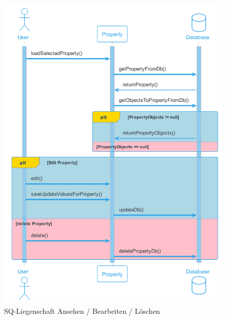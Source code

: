 \begin{figure}[H]
  \begin{center}
    \includegraphics[width=0.5\textheight]{content/diagrams/out/sequenzdiagram/liegenschaftAnsehenBearbeiten/LiegenschaftAnsehenBearbeiten.png}
    \caption{SQ-Liegenschaft Ansehen / Bearbeiten / Löschen}
  \end{center}
\end{figure}

